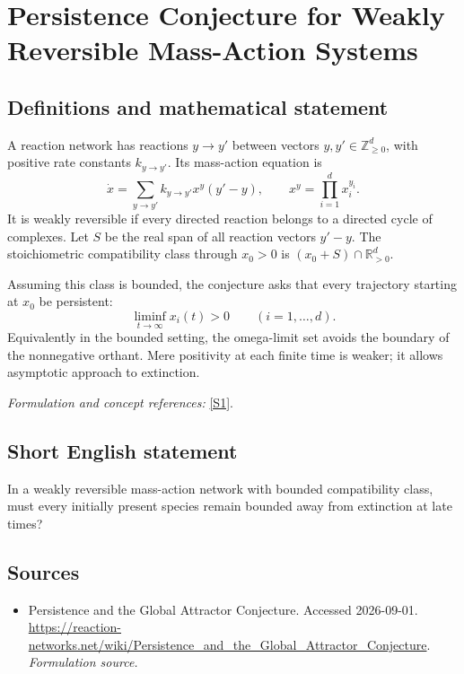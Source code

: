 \documentclass[11pt]{article}
\begin{document}
\section*{\texorpdfstring{Persistence Conjecture for Weakly Reversible Mass-Action Systems}{Persistence Conjecture for Weakly Reversible Mass-Action Systems}}\label{481}
\subsection{Definitions and mathematical statement}
A reaction network has reactions $y\to y'$ between vectors $y,y'\in{\mathbb{Z}}_{\ge0}^d$, with positive rate constants $k_{y\to y'}$. Its mass-action equation is
\[
 \dot x=\sum_{y\to y'}k_{y\to y'}x^y(y'-y),
 \qquad x^y=\prod_{i=1}^dx_i^{y_i}.
\]
It is weakly reversible if every directed reaction belongs to a directed cycle of complexes. Let $S$ be the real span of all reaction vectors $y'-y$. The stoichiometric compatibility class through $x_0>0$ is $(x_0+S)\cap{\mathbb{R}}_{>0}^d$.

Assuming this class is bounded, the conjecture asks that every trajectory starting at $x_0$ be persistent:
\[
 \liminf_{t\to\infty}x_i(t)>0\qquad(i=1,\ldots,d).
\]
Equivalently in the bounded setting, the omega-limit set avoids the boundary of the nonnegative orthant. Mere positivity at each finite time is weaker; it allows asymptotic approach to extinction.
\par\smallskip\textit{Formulation and concept references:} \href{https://reaction-networks.net/wiki/Persistence_and_the_Global_Attractor_Conjecture}{[S1]}.

\subsection{Short English statement}
In a weakly reversible mass-action network with bounded compatibility class, must every initially present species remain bounded away from extinction at late times?
\subsection{Sources}
\begin{itemize}
\item[S1]Persistence and the Global Attractor Conjecture. Accessed 2026-09-01.
\url{https://reaction-networks.net/wiki/Persistence_and_the_Global_Attractor_Conjecture}.
\textit{Formulation source.}
\end{itemize}
\end{document}
